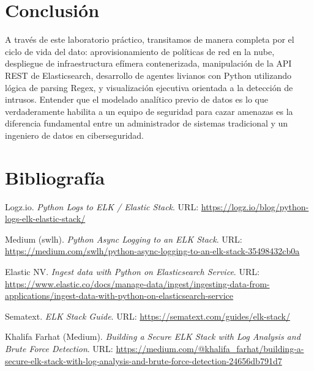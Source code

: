 \documentclass[
  coursetitle={Cómputo Nube y Tecnologías Emergentes},
  coursehours={96},
  coursedate={Verano 2026},
  doctype={Guía de Laboratorio Práctico},
  otherlangs={english,french},
  authorname={Lázaro},
  authorsurname={Bustio-Martínez},
  authortitle={PhD},
  role={Profesor Investigador},
  email={lbustio@inaoe.mx},
  phone={5559504000},
  ext={7459},
  institution={Instituto Nacional de Astrofísica, Óptica y Electrónica (INAOE)},
  department={Maestría en Ciencias en Tecnologías de Seguridad},
  address={Luis Enrique Erro 1, Sta. Ma. Tonantzintla, San Andrés Cholula, CP 72840, Puebla, México},
  margin={0.5in}
]{../../lbustio_lecture_notes}
\begin{document}
\section{Conclusión}
A través de este laboratorio práctico, transitamos de manera completa por el ciclo de vida del dato: aprovisionamiento de políticas de red en la nube, despliegue de infraestructura efímera contenerizada, manipulación de la API REST de Elasticsearch, desarrollo de agentes livianos con Python utilizando lógica de parsing Regex, y visualización ejecutiva orientada a la detección de intrusos. Entender que el modelado analítico previo de datos es lo que verdaderamente habilita a un equipo de seguridad para cazar amenazas es la diferencia fundamental entre un administrador de sistemas tradicional y un ingeniero de datos en ciberseguridad.

\section{Bibliografía}
\begin{thebibliography}{9}

Logz.io. \textit{Python Logs to ELK / Elastic Stack}. URL: \url{https://logz.io/blog/python-logs-elk-elastic-stack/}

Medium (swlh). \textit{Python Async Logging to an ELK Stack}. URL: \url{https://medium.com/swlh/python-async-logging-to-an-elk-stack-35498432cb0a}

Elastic NV. \textit{Ingest data with Python on Elasticsearch Service}. URL: \url{https://www.elastic.co/docs/manage-data/ingest/ingesting-data-from-applications/ingest-data-with-python-on-elasticsearch-service}

Sematext. \textit{ELK Stack Guide}. URL: \url{https://sematext.com/guides/elk-stack/}

Khalifa Farhat (Medium). \textit{Building a Secure ELK Stack with Log Analysis and Brute Force Detection}. URL: \url{https://medium.com/@khalifa_farhat/building-a-secure-elk-stack-with-log-analysis-and-brute-force-detection-24656db791d7}

\end{thebibliography}
\end{document}
